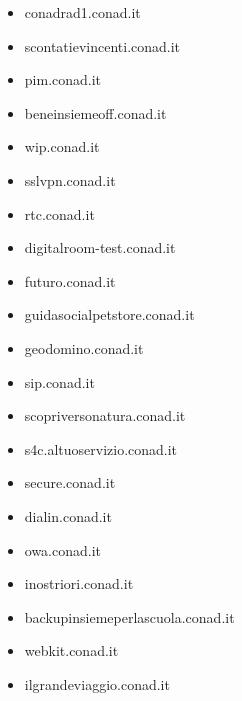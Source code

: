 \documentclass{article}
\begin{document}
\begin{itemize}
            \item conadrad1.conad.it
        
            \item scontatievincenti.conad.it
        
            \item pim.conad.it
        
            \item beneinsiemeoff.conad.it
        
            \item wip.conad.it
        
            \item sslvpn.conad.it
        
            \item rtc.conad.it
        
            \item digitalroom-test.conad.it
        
            \item futuro.conad.it
        
            \item guidasocialpetstore.conad.it
        
            \item geodomino.conad.it
        
            \item sip.conad.it
        
            \item scopriversonatura.conad.it
        
            \item s4c.altuoservizio.conad.it
        
            \item secure.conad.it
        
            \item dialin.conad.it
        
            \item owa.conad.it
        
            \item inostriori.conad.it
        
            \item backupinsiemeperlascuola.conad.it
        
            \item webkit.conad.it
        
            \item ilgrandeviaggio.conad.it
        

\end{itemize}
\end{document}
